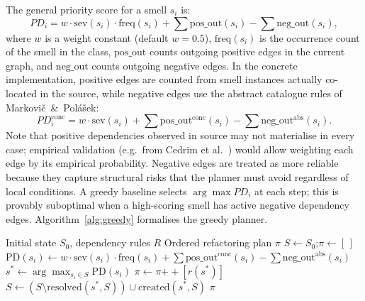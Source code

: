 \documentclass[conference]{IEEEtran}
\begin{document}
The general priority score for a smell $s_i$ is:
\begin{equation}
  PD_i = w \cdot \mathrm{sev}(s_i) \cdot \mathrm{freq}(s_i)
         + \textstyle\sum \mathrm{pos\_out}(s_i)
         - \textstyle\sum \mathrm{neg\_out}(s_i),
  \label{eq:pd-general}
\end{equation}
where $w$ is a weight constant (default $w{=}0.5$), $\mathrm{freq}(s_i)$ is
the occurrence count of the smell in the class, $\mathrm{pos\_out}$ counts
outgoing positive edges in the current graph, and $\mathrm{neg\_out}$ counts
outgoing negative edges.
In the concrete implementation, positive edges are counted from
smell instances actually co-located in the source, while negative edges use
the abstract catalogue rules of Markovič~\&~Polášek:
\begin{equation}
  PD^{\mathrm{conc}}_i = w \cdot \mathrm{sev}(s_i)
         + \textstyle\sum \mathrm{pos\_out}^{\mathrm{conc}}(s_i)
         - \textstyle\sum \mathrm{neg\_out}^{\mathrm{abs}}(s_i).
  \label{eq:pd-concrete}
\end{equation}
Note that positive dependencies observed in source may not materialise in
every case; empirical validation (e.g.\ from Cedrim et al.~\cite{cedrim2017})
would allow weighting each edge by its empirical probability.
Negative edges are treated as more reliable because they capture structural
risks that the planner must avoid regardless of local conditions.
A greedy baseline selects $\arg\max PD_i$ at each step; this is provably
suboptimal when a high-scoring smell has active negative dependency edges.
Algorithm~\ref{alg:greedy} formalises the greedy planner.

\begin{algorithm}[tb]
\caption{Greedy refactoring planner}
\label{alg:greedy}
\begin{algorithmic}[1]
\REQUIRE Initial state $S_0$, dependency rules $R$
\ENSURE Ordered refactoring plan $\pi$
\STATE $S \leftarrow S_0$;\quad $\pi \leftarrow [\,]$
    \STATE $\mathrm{PD}(s_i) \leftarrow w \cdot \mathrm{sev}(s_i) \cdot \mathrm{freq}(s_i) + \sum\mathrm{pos\_out}^{\mathrm{conc}}(s_i) - \sum\mathrm{neg\_out}^{\mathrm{abs}}(s_i)$
  \ENDFOR
  \STATE $s^* \leftarrow \arg\max_{s_i \in S} \mathrm{PD}(s_i)$
  \STATE $\pi \leftarrow \pi{+\!\!+}[r(s^*)]$
  \STATE $S \leftarrow (S \setminus \mathrm{resolved}(s^*,S)) \cup \mathrm{created}(s^*,S)$
\ENDWHILE
\RETURN $\pi$
\end{algorithmic}
\end{algorithm}
\end{document}
